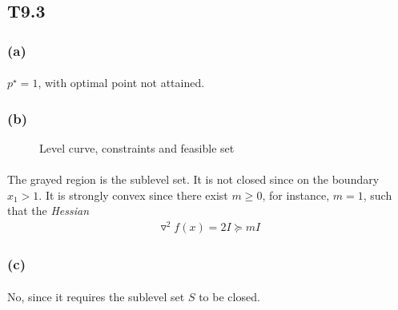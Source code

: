 \subsection*{T9.3}
\subsubsection*{(a)}
\paragraph{}
$p^\star = 1$, with optimal point not attained.
\subsubsection*{(b)}
\begin{figure}[h]
	\centering
	\caption{Level curve, constraints and feasible set}
\end{figure}
\paragraph{}
The grayed region is the sublevel set. It is not closed since on the boundary $x_1 > 1$. It is strongly convex since there exist $m \geq 0 $, for instance, $m=1$, such that the \textit{Hessian}
\begin{align*}
\triangledown^2f(x) = 2I \succeq mI
\end{align*}
\subsubsection*{(c)}
\paragraph{}
No, since it requires the sublevel set $S$ to be closed.